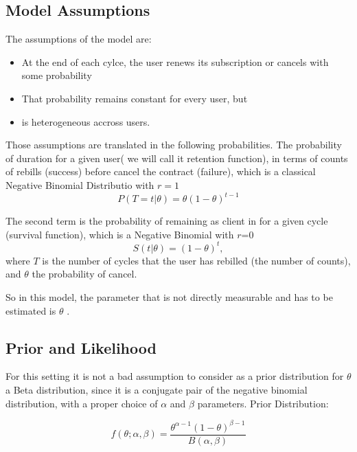 \documentclass[paper=a4, fontsize=11pt]{scrartcl} %
\numberwithin{equation}{section} %
\numberwithin{figure}{section} %
\numberwithin{table}{section} %
\begin{document}
 \subsection{Model Assumptions} 
 The assumptions of the model are:
 \begin{itemize}
  \item At the end of each cylce, the user renews its subscription or cancels with some probability
  \item That probability remains constant for every user, but
  \item is heterogeneous accross users.
\end{itemize}
 
 Those assumptions are translated in the following probabilities. The probability of duration for a given user( we will call it retention function), in terms of counts of rebills (success) before cancel the contract (failure), which is a classical Negative Binomial Distributio with $r=1$\\
 \begin{equation} \label{eq1}
 P(T=t | \theta) = \theta (1-\theta)^{t-1}
 \end{equation}
 
 The second term is the probability of remaining as client in for a given cycle (survival function), which is a Negative Binomial with $r$=0\\
  \begin{equation} \label{eq2}
S(t | \theta) = (1-\theta)^t,
 \end{equation}
where $T$ is the number of cycles that the user has rebilled (the number of counts), and $\theta$ the probability of cancel.
  
  So in this model, the parameter that is not directly measurable and has to be estimated is $\theta$
. 
 \subsection{Prior and Likelihood} 
For this setting it is not a bad assumption to consider as a prior distribution for $\theta$ a Beta distribution, since it is a conjugate pair of the negative binomial distribution, with a proper choice of $\alpha$ and $\beta$ parameters. Prior Distribution:

\begin{equation} \label{eq3}
f(\theta; \alpha, \beta) = \frac{\theta^{\alpha-1}(1-\theta)^{\beta-1}}{B(\alpha,\beta)}
\end{equation}
\end{document}
